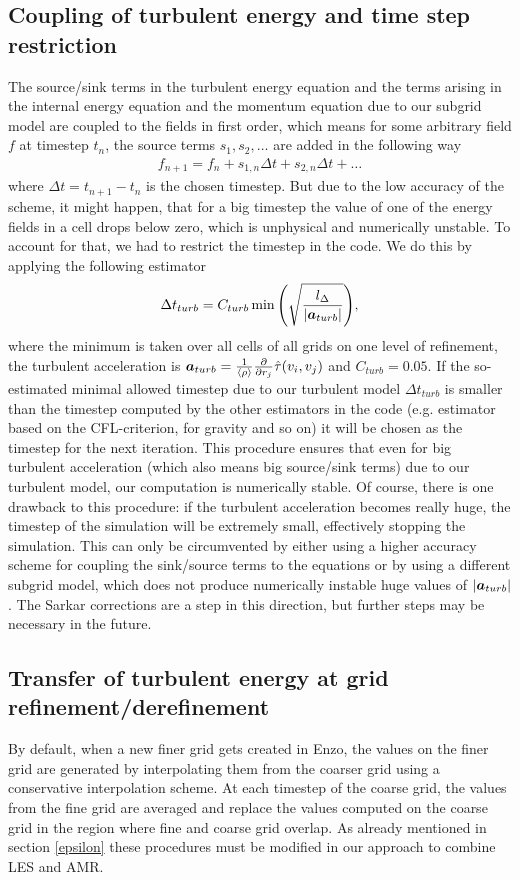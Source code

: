 \subsection{Coupling of turbulent energy and time step restriction}
The source/sink terms in the turbulent energy equation and the terms arising in
the internal energy equation and the momentum equation due to our subgrid model
are coupled to the fields in first order, which means for some arbitrary field
$f$ at timestep $t_n$, the source terms $s_1,s_2, \ldots$ are added in the
following way 
\begin{align}
f_{n+1} = f_n + s_{1,n} \Delta t + s_{2,n} \Delta t + \ldots
\end{align}
where $\Delta t = t_{n+1}-t_n $ is the chosen timestep. But due to the low
accuracy of the scheme, it might happen, that for a big timestep the value of
one of the energy fields in a cell drops below zero, which is unphysical and
numerically unstable. To account for that, we had to restrict the timestep in
the code. We do this by applying the following estimator
\begin{align}
\Delta t_{turb} = C_{turb} 
\min { \left( \sqrt{\frac{l_{\Delta}}{\left\lvert\boldsymbol{a}_{turb}\right\rvert}} \right) },
\end{align}
where the minimum is taken over all cells of all grids on one
level of refinement, the turbulent acceleration is $\boldsymbol{a}_{turb}=
\frac{1}{\langle \rho \rangle}{\frac{\partial}{\partial r_j}\hat{\tau}(v_i,v_j)}$ and $C_{turb} = 0.05$. If
the so-estimated minimal allowed timestep due to our turbulent model $
\Delta t_{turb}$ is smaller than the timestep computed by the other estimators
in the code (e.g. estimator based on the CFL-criterion, for gravity and so on) 
it will be chosen as the timestep for the next iteration. This procedure
ensures that even for big turbulent acceleration (which also means
big source/sink terms) due to our turbulent model, our computation is
numerically stable. Of course, there is one drawback to this procedure: if the
turbulent acceleration becomes really huge, the timestep of the simulation will
be extremely small, effectively stopping the simulation. This can only be
circumvented by either using a higher accuracy scheme for coupling the 
sink/source terms to the equations or by using a different subgrid model, which
does not produce numerically instable huge values of $\left\lvert\boldsymbol{a}_{turb}\right\rvert$.
The Sarkar corrections are a step in this direction, but further steps may be
necessary in the future. 

\subsection{Transfer of turbulent energy at grid refinement/derefinement}
By default, when a new finer grid gets created in Enzo, the values on the finer
grid are generated by interpolating them from the coarser grid using a
conservative interpolation scheme. At each timestep of the coarse grid, the
values from the fine grid are averaged and replace the values computed on the 
coarse grid in the region where fine and coarse grid overlap. As already
mentioned in section \ref{epsilon} these procedures must be modified in our
approach to combine LES and AMR.

